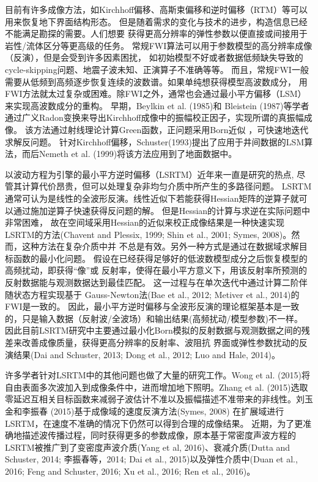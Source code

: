 目前有许多成像方法，如Kirchhoff偏移、高斯束偏移和逆时偏移（RTM）等可以用来恢复地下界面结构形态。
但是随着需求的变化与技术的进步，构造信息已经不能满足勘探的需要。人们想要
获得更高分辨率的弹性参数以便直接或间接用于岩性/流体区分等更高级的任务。
常规FWI算法可以用于参数模型的高分辨率成像（反演），但是会受到许多因素困扰，
如初始模型不好或者数据低频缺失导致的cycle-skipping问题、地震子波未知、正演算子不准确等等。
而且，常规FWI一般需要从低频到高频逐步恢复连续的波数谱。如果单纯想获得模型高波数成分，
用FWI方法就太过复杂或困难。除FWI之外，通常也会通过最小平方偏移（LSM）来实现高波数成分的重构。
早期，Beylkin
et al. (1985)\cite{BeylkinEtAl1985}和
Bleistein (1987)\cite{Bleistein1987}等学者通过广义Radon变换来导出Kirchhoff成像中的振幅校正因子，实现所谓的真振幅成像。
该方法通过射线理论计算Green函数，正问题采用Born近似
，可快速地迭代求解反问题。
针对Kirchhoff偏移，Schuster(1993)\cite{Schuster1993}提出了应用于井间数据的LSM算法，而后Nemeth et al.
(1999)\cite{Nemeth1999}将该方法应用到了地面数据中。

以波动方程为引擎的最小平方逆时偏移（LSRTM）近年来一直是研究的热点,
尽管其计算代价昂贵，但可以处理复杂非均匀介质中所产生的多路径问题。
LSRTM通常可认为是线性的全波形反演。线性近似下若能获得Hessian矩阵的逆算子就可以通过施加逆算子快速获得反问题的解。
但是Hessian的计算与求逆在实际问题中非常困难，
故在空间域采用Hessian的近似来校正成像结果是一种快速实现LSRTM的方法(Chavent and Plessix, 
1999\cite{ChaventEtAl1999}; Shin et al., 2001\cite{shin2001improved}; Symes,
2008\cite{Symes2008})。然而，这种方法在复杂介质中并
不总是有效。另外一种方式是通过在数据域求解目标函数的最小化问题。
假设在已经获得足够好的低波数模型成分之后恢复模型的高频扰动，即获得“像”或
反射率，使得在最小平方意义下，用该反射率所预测的反射数据能与观测数据达到最佳匹配。
这一过程与在单次迭代中通过计算二阶伴随状态方程实现基于
Gauss-Newton法(Bae et al., 2012\cite{bae2012frequency}; Metiver et al.,
2014\cite{Metivier2014})的FWI是一致的。
因此，最小平方逆时偏移与全波形反演的理论框架基本是一致的，只是输入数据（反射波/全波场）和输出结果(高频扰动/模型参数)不一样。
因此目前LSRTM研究中主要通过最小化Born模拟的反射数据与观测数据之间的残差来改善成像质量，获得更高分辨率的反射率、波阻抗
界面或弹性参数扰动的反演结果(Dai and
Schuster, 2013\cite{Dai2013}; Dong et al., 2012\cite{Dong2012}; Luo and
Hale, 2014\cite{Luo2014})。

许多学者针对LSRTM中的其他问题也做了大量的研究工作。Wong et al.
(2015)\cite{WongEtAl2015}将自由表面多次波加入到成像条件中，进而增加地下照明。Zhang et al.
(2015)\cite{ZhangEtAl2015}选取零延迟互相关目标函数来减弱子波估计不准以及振幅描述不准带来的非线性。刘玉金和李振春
(2015)\cite{刘玉金2015}基于成像域的速度反演方法(Symes, 2008\cite{Symes2008a})
在扩展域进行LSRTM，在速度不准确的情况下仍然可以得到合理的成像结果。
近期，为了更准确地描述波传播过程，同时获得更多的参数成像，原本基于常密度声波方程的
LSRTM被推广到了变密度声波介质(Yang et al, 2016)\cite{Yang2016}、衰减介质(Dutta and
Schuster, 2014\cite{DuttaEtAl2014}; 李振春等，2014\cite{李振春2014}; Dai et al.,
2015\cite{Dai2015})以及弹性介质中(Duan et al., 2016\cite{Duan2016}; Feng and Schuster,
2016\cite{Feng2016}; Xu et al., 2016\cite{Xu2016}; Ren et al., 2016\cite{RenEtAl2016})。

